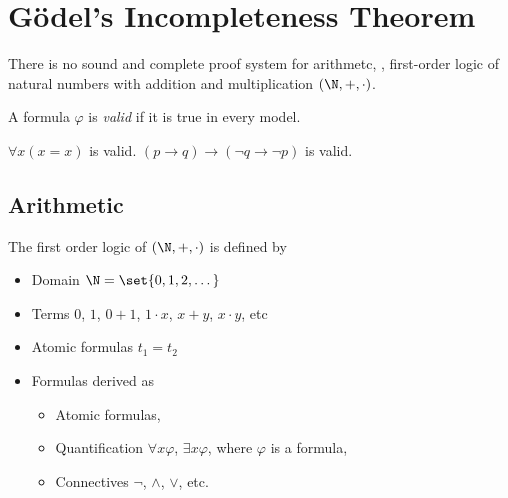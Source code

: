 \chapter{G\"odel's Incompleteness Theorem} \label{chp:godel}

\begin{theorem*}[Godel (1931)] \label{thm:godel1}
    There is no sound and complete proof system for arithmetc, \ie,
    first-order logic of natural numbers with addition and multiplication
    $(\N, +, \cdot)$.
\end{theorem*}

\begin{definition}[Validity] \label{def:validity}
    A formula $\varphi$ is \emph{valid} if it is true in every model.
\end{definition}
\begin{example}
    $\forall x (x = x)$ is valid.
    $(p \rightarrow q) \rightarrow (\neg q \rightarrow \neg p)$ is valid.
\end{example}

\section{Arithmetic} \label{sec:arithmetic}
The first order logic of $(\N, +, \cdot)$ is defined by
\begin{itemize}
    \item Domain $\N = \set{0, 1, 2, \dots}$
    \item Terms $0$, $1$, $0 + 1$, $1 \cdot x$, $x + y$, $x \cdot y$, etc
    \item Atomic formulas $t_1 = t_2$
    \item Formulas derived as
    \begin{itemize}
        \item Atomic formulas,
        \item Quantification $\forall x \varphi$, $\exists x \varphi$,
        where $\varphi$ is a formula,
        \item Connectives $\neg$, $\land$, $\lor$, etc.
    \end{itemize}
\end{itemize}

